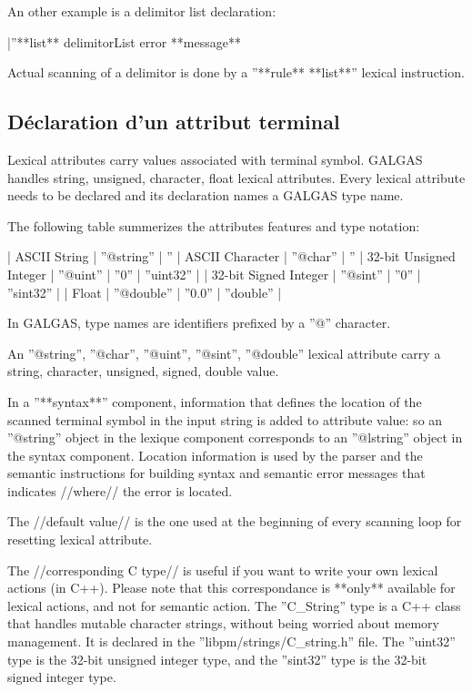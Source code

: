 {An other example is a delimitor list declaration:

|''**list** delimitorList error **message** %

Actual scanning of a delimitor is done by a ''**rule** **list**'' lexical instruction.

\subsection{Déclaration d'un attribut terminal}

Lexical attributes carry values associated with terminal symbol. GALGAS handles string, unsigned, character, float lexical attributes. Every lexical attribute needs to be declared and its declaration names a GALGAS type name.


 The following table summerizes the attributes features and type notation:

| ASCII String | ''@string'' | ''%
| ASCII Character | ''@char'' | ''%
| 32-bit Unsigned Integer | ''@uint'' | ''0'' | ''uint32'' |
| 32-bit Signed Integer | ''@sint'' | ''0'' | ''sint32'' |
| Float | ''@double'' | ''0.0'' | ''double'' |

In GALGAS, type names are identifiers prefixed by a ''@'' character.

An ''@string'', ''@char'', ''@uint'', ''@sint'', ''@double'' lexical attribute carry a string, character, unsigned, signed, double value.

In a ''**syntax**'' component, information that defines the location of the scanned terminal symbol in the input string is added to attribute value: so an ''@string'' object in the lexique component corresponds to an ''@lstring'' object in the syntax component. Location information is used by the parser and the semantic instructions for building syntax and semantic error messages that indicates //where// the error is located.

The //default value// is the one used at the beginning of every scanning loop for resetting lexical attribute.

The //corresponding C type// is useful if you want to write your own lexical actions (in C++). Please note that this correspondance is **only** available for lexical actions, and not for semantic action. The ''C\_String'' type is a C++ class that handles mutable character strings, without being worried about memory management. It is declared in the ''libpm/strings/C\_string.h'' file. The ''uint32'' type is the 32-bit unsigned integer type, and the ''sint32'' type is the 32-bit signed integer type. 
 

}
